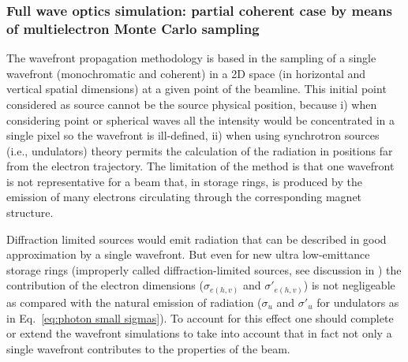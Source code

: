 \documentclass{iucr}              %
\begin{document}
\begin{table}\label{tab:SRW_results}
\centering
\caption{Beam dimensions (FWHM, in nm) at the focal position for different models of focusing elements.}
\end{table}


\subsubsection{Full wave optics simulation: partial coherent case by means of multielectron Monte Carlo sampling}
\label{srw_me}
The wavefront propagation methodology is based in the sampling of a single wavefront (monochromatic and coherent) in a 2D space (in horizontal and vertical spatial dimensions) at a given point of the beamline. This initial point considered as source cannot be the source physical position, because i) when considering point or spherical waves all the intensity would be concentrated in a single pixel so the wavefront is ill-defined, ii) when using synchrotron sources (i.e., undulators) theory \cite{jackson} permits the calculation of the radiation in positions far from the electron trajectory. The limitation of the method is that one wavefront is not representative for a beam that, in storage rings, is produced by the emission of many electrons circulating through the corresponding magnet structure. 

Diffraction limited sources would emit radiation that can be described in good approximation by a single wavefront. But even for new ultra low-emittance storage rings (improperly called diffraction-limited sources, see discussion in \cite{arxivCF}) the contribution of the electron dimensions ($\sigma_{e(h,v)}$ and $\sigma'_{e(h,v)}$) is not negligeable as compared with the natural emission of radiation ($\sigma_u$ and $\sigma'_u$ for undulators as in Eq.~\ref{eq:photon small sigmas}). To account for this effect one should complete or extend the wavefront simulations to take into account that in fact not only a single wavefront contributes to the properties of the beam. 
\end{document}
